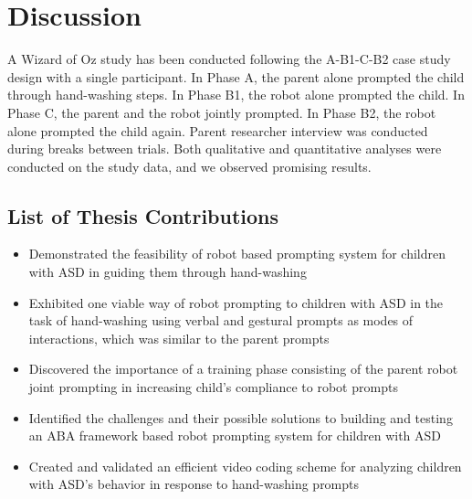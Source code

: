 \section{Discussion}
A Wizard of Oz study has been conducted following the A-B1-C-B2 case study design with a single participant.  In Phase A, the parent alone prompted the child through hand-washing steps.  In Phase B1, the robot alone prompted the child.  In Phase C, the parent and the robot jointly prompted.  In Phase B2, the robot alone prompted the child again.  Parent researcher interview was conducted during breaks between trials.  Both qualitative and quantitative analyses were conducted on the study data, and we observed promising results.

\subsection{List of Thesis Contributions}
\begin{itemize}
	\item Demonstrated the feasibility of robot based prompting system for children with ASD in guiding them through hand-washing
	\item Exhibited one viable way of robot prompting to children with ASD in the task of hand-washing using verbal and gestural prompts as modes of interactions, which was similar to the parent prompts
	\item Discovered the importance of a training phase consisting of the parent robot joint prompting in increasing child's compliance to robot prompts
	\item Identified the challenges and their possible solutions to building and testing an ABA framework based robot prompting system for children with ASD
	\item Created and validated an efficient video coding scheme for analyzing children with ASD's behavior in response to hand-washing prompts
\end{itemize}	


